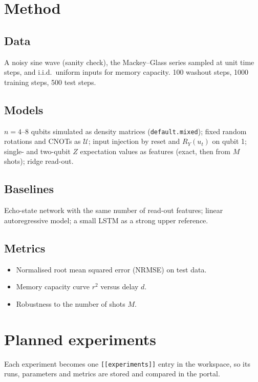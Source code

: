 \documentclass[11pt,a4paper]{article}
\begin{document}
\section{Method}
\subsection{Data}
A noisy sine wave (sanity check), the Mackey--Glass series sampled at unit time steps, and
i.i.d.\ uniform inputs for memory capacity. 100 washout steps, 1000 training steps, 500 test steps.

\subsection{Models}
$n=4$--$8$ qubits simulated as density matrices (\texttt{default.mixed}); fixed random rotations and
CNOTs as $\mathcal U$; input injection by reset and $R_Y(u_t)$ on qubit 1; single- and two-qubit $Z$
expectation values as features (exact, then from $M$ shots); ridge read-out.

\subsection{Baselines}
Echo-state network with the same number of read-out features; linear autoregressive model; a small
LSTM as a strong upper reference.

\subsection{Metrics}
\begin{itemize}
  \item Normalised root mean squared error (NRMSE) on test data.
  \item Memory capacity curve $r^2$ versus delay $d$.
  \item Robustness to the number of shots $M$.
\end{itemize}

\section{Planned experiments}
Each experiment becomes one \texttt{[[experiments]]} entry in the workspace, so its runs, parameters
and metrics are stored and compared in the portal.
\end{document}
